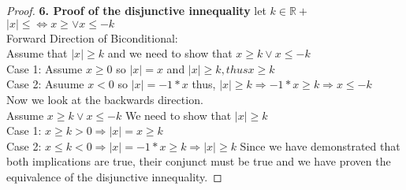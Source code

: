 \documentclass[12pt]{article}
\theoremstyle{definition}
\begin{document}
\begin{proof}
   \textbf{6. Proof of the disjunctive innequality}
   let $k \in \mathbb{R+} $
$   \mid x \mid \le \iff x \ge \vee x \le -k$\\
   Forward Direction of Biconditional:\\
   Assume that $\mid x \mid \ge k $ and we need to show that $x \ge k \vee x \le -k $\\
   Case 1: Assume $ x \ge 0$ so $\mid x \mid = x$ and $\mid x \mid \ge k ,thus x \ge k$\\
   Case 2: Asuume $ x < 0$ so $\mid x \mid = -1 * x$ thus, $ \mid x \mid \ge k \Rightarrow -1 * x \ge k \Rightarrow x \le -k $\\
   Now we look at the backwards direction.\\
   Assume $x \ge k \vee x \le -k$ We need to show that $\mid x \mid \ge k $\\
   Case 1: $ x \ge k > 0 \Rightarrow \mid x \mid = x \ge k$\\
   Case 2: $x \le k < 0 \Rightarrow \mid x \mid = -1 * x \ge k \Rightarrow \mid x \mid \ge k$
   Since we have demonstrated that both implications are true, their conjunct must be true and we have proven the equivalence of the disjunctive innequality.



\end{proof}
\end{document}
